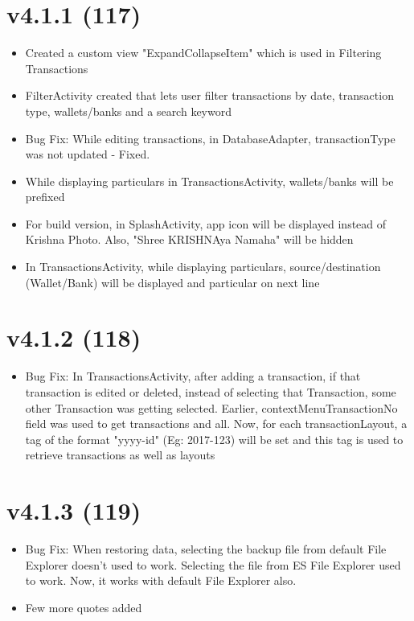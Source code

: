 \documentclass{article}
\begin{document}
    \section{v4.1.1 (117)}\label{sec:117}
    \begin{itemize}
        \item Created a custom view "ExpandCollapseItem" which is used in Filtering Transactions
        \item FilterActivity created that lets user filter transactions by date, transaction type, wallets/banks and a search keyword
        \item Bug Fix: While editing transactions, in DatabaseAdapter, transactionType was not updated - Fixed.
        \item While displaying particulars in TransactionsActivity, wallets/banks will be prefixed
        \item For build version, in SplashActivity, app icon will be displayed instead of Krishna Photo.
        Also, "Shree KRISHNAya Namaha" will be hidden
        \item In TransactionsActivity, while displaying particulars, source/destination (Wallet/Bank) will be displayed and particular on next line
    \end{itemize}

    \section{v4.1.2 (118)}\label{sec:118}
    \begin{itemize}
        \item Bug Fix: In TransactionsActivity, after adding a transaction, if that transaction is edited or deleted, instead of selecting that Transaction, some other Transaction was getting selected.
        Earlier, contextMenuTransactionNo field was used to get transactions and all.
        Now, for each transactionLayout, a tag of the format "yyyy-id" (Eg: 2017-123) will be set and this tag is used to retrieve transactions as well as layouts
    \end{itemize}

    \section{v4.1.3 (119)}\label{sec:119}
    \begin{itemize}
        \item Bug Fix: When restoring data, selecting the backup file from default File Explorer doesn't used to work.
        Selecting the file from ES File Explorer used to work.
        Now, it works with default File Explorer also.
        \item Few more quotes added
    \end{itemize}
\end{document}
